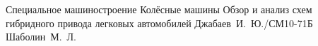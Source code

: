 \documentclass{bmstu}
\begin{document}
\makeresearchtitle
    {Специальное машиностроение} %
    {Колёсные машины} %
    {Обзор и анализ схем гибридного привода легковых автомобилей} %
    {Джабаев~И.~Ю./СМ10-71Б} %
    {Шаболин~М.~Л.} %
    {} %



\maketableofcontents

%







\makebibliography


\end{document}
